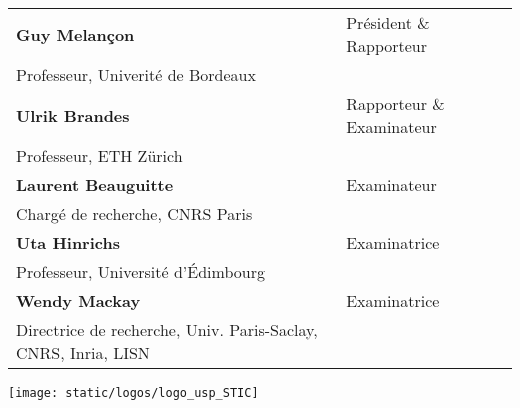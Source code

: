 \documentclass[12pt,a4paper, twoside, headings=small]{book}
\begin{document}
\begin{titlepage}
        \begin{tabular}{|p{9cm}l}
            \arrayrulecolor{Prune}
            \textbf{Guy Melançon} & Président \& Rapporteur \\
            Professeur, Univerité de Bordeaux  &                                   \\
            \textbf{Ulrik Brandes} & Rapporteur \& Examinateur \\
            Professeur, ETH Zürich  &                                   \\
            \textbf{Laurent Beauguitte} & Examinateur       \\
            Chargé de recherche, CNRS Paris  &                                   \\
            \textbf{Uta Hinrichs} & Examinatrice       \\
            Professeur, Université d'Édimbourg  &                                   \\
            \textbf{Wendy Mackay} & Examinatrice       \\
            Directrice de recherche, Univ. Paris-Saclay, CNRS, Inria, LISN  &   \\
        \end{tabular}
    \end{titlepage}

    \Ifthispageodd{\newpage\thispagestyle{empty}\null\newpage}{}
    \thispagestyle{empty}
    \selectfont

    \lhead{}
    \rhead{}
    \rfoot{}
    \cfoot{}
    \lfoot{}

    \noindent
    \texttt{[image: static/logos/logo\_usp\_STIC]}
    \vspace{1cm}
    \selectfont
\end{document}
